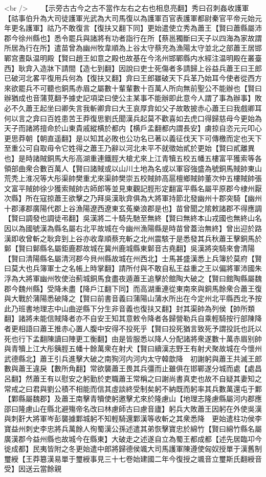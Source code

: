 <br />
　　【示旁古古今之古不當作左右之右也相息亮翻】秀曰召刺姦收護軍【祜事伯升為大司徒護軍光武為大司馬復以為護軍百官表護軍都尉秦官平帝元始元年更名護軍】祜乃不敢復言【復扶又翻下同】更始遣使立秀為蕭王【賢曰蕭縣屬沛郡今徐州縣也】悉令罷兵與諸將有功者詣行在所【蔡邕獨斷曰天子以四海為家故謂所居為行在所】遣苗曾為幽州牧韋順為上谷太守蔡充為漁陽太守並北之部蕭王居邯鄲宫晝臥温明殿【賢曰趙王如意之殿也故基在今洺州邯鄲縣内水經注温明殿在叢臺西】耿弇入造牀下請間【造七到翻】因說曰吏士死傷者多請歸上谷益兵蕭王曰王郎已破河北畧平復用兵何為【復扶又翻】弇曰王郎雖破天下兵革乃始耳今使者從西方來欲罷兵不可聽也銅馬赤眉之屬數十輩輩數十百萬人所向無前聖公不能辦也【賢曰辦猶成也音蒲莧翻予據史記項梁曰使公主某事不能辦即此意今人謂了事為辦事】敗必不久蕭王起坐曰卿失言我斬卿弇曰大王哀厚弇如父子故敢披赤心蕭王曰我戲卿耳何以言之弇曰百姓患苦王莽復思劉氏聞漢兵起莫不歡喜如去虎口得歸慈母今更始為天子而諸將擅命於山東貴戚縱横於都内【横戶孟翻都内謂長安】虜掠自恣元元叩心更思莽朝【朝直遥翻】是以知其必敗也公功名已著以義征伐天下可傳檄而定也天下至重公可自取毋令它姓得之蕭王乃辭以河北未平不就徵始貳於更始【賢曰貳離異也】是時諸賊銅馬大彤高湖重連鐵脛大槍尤來上江青犢五校五幡五樓富平獲索等各領部曲衆合數百萬人【賢曰諸賊或以山川土地為名或以軍容強盛為號銅馬賊帥東山荒秃上淮况等大彤渠帥樊重尤來渠帥樊崇五校賊帥高扈檀鄉賊帥董次仲五樓賊帥張文富平賊帥徐少獲索賊帥古師郎等並見東觀記脛形定翻富平縣名屬平原郡今棣州厭次縣】所在寇掠蕭王欲擊之乃拜吳漢耿弇俱為大將軍持節北發幽州十郡突騎【幽州十郡涿郡廣陽代郡上谷漁陽遼西遼東玄菟樂浪郡是也】苗曾聞之隂敕諸郡不得應調【賢曰調發也調徒弔翻】吳漢將二十騎先馳至無終【賢曰無終本山戎國也無終山名因以為國號漢為縣名屬右北平故城在今幽州漁陽縣是時苗曾蓋治無終】曾出迎於路漢即收曾斬之耿弇到上谷亦收韋順蔡充斬之北州震駭于是悉發其兵秋蕭王擊銅馬於鄡【賢曰鄡縣名屬鉅鹿郡故城在冀州鹿城縣東鄡音古堯翻】吳漢將突騎來會清陽【賢曰清陽縣名屬清河郡今貝州縣故城在州西北】士馬甚盛漢悉上兵簿於莫府【賢曰莫大也兵簿軍士之名帳上時掌翻】請所付與不敢自私王益重之王以偏將軍沛國朱浮為大將軍幽州牧使治薊城銅馬食盡夜遁蕭王追擊於館陶大破之【賢曰館陶縣屬魏郡今魏州縣】受降未盡【降戶江翻下同】而高湖重連從東南來與銅馬餘衆合蕭王復與大戰於蒲陽悉破降之【賢曰前書音義曰蒲陽山蒲水所出在今定州北平縣西北予按此乃班書地理志中山曲逆縣下分生非音義也復扶又翻】封其渠帥為列侯【帥所類翻】諸將未能信賊降者亦不自安王知其意敕令降者各歸營勒兵自乘輕騎按行部陳降者更相語曰蕭王推赤心置人腹中安得不投死乎【賢曰投死猶言致死予謂投託也託以死也行下孟翻陳讀曰陣更工衡翻】由是皆服悉以降人分配諸將衆遂數十萬赤眉别帥與青犢上江大彤銕脛五幡十餘萬衆在射犬【賢曰續漢志野王有射犬聚故城在今懷州武德縣北】蕭王引兵進擊大破之南狥河内河内太守韓歆降　初謝躬與蕭王共滅王郎數與蕭王違戾【數所角翻】常欲襲蕭王畏其兵彊而止雖俱在邯鄲遂分城而處【處昌呂翻】然蕭王有以慰安之躬勤於吏職蕭王常稱之曰謝尚書真吏也故不自疑其妻知之常戒之曰君與劉公積不相能而信其虛談終受制矣躬不納既而躬率其兵數萬還屯于鄴【鄴縣屬魏郡】及蕭王南擊青犢使躬邀擊尤來於隆慮山【地理志隆慮縣屬河内郡應邵曰隆慮山在縣北避殤帝名改曰林慮師古曰慮音廬】躬兵大敗蕭王因躬在外使吳漢與刺姧大將軍岑彭襲據鄴城躬不知輕騎還鄴漢等收斬之其衆悉降　更始遣柱功侯李寶益州刺史李忠將兵萬餘人徇蜀漢公孫述遣其弟恢擊寶忠於綿竹【賢曰綿竹縣名屬廣漢郡今益州縣也故城今在縣東】大破走之述遂自立為蜀王都成都【述先居臨卭今徙成都】民夷皆附之冬更始遣中郎將歸德侯颯大司馬護軍陳遵使匈奴授單于漢舊制璽綬【王莽簒漢易單于璽綬事見三十七卷始建國二年今復授之颯音立璽斯氏翻綬音受】因送云當餘親